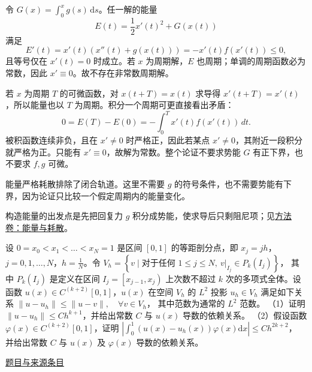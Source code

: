 \documentclass[12pt,fontset=fandol]{ctexart}
\begin{document}
\begin{solve}\label{ans:fin15-low:10}

令 $G(x)=\int_0^xg(s)\,\mathrm ds$。任一解的能量
\[
E(t)=\frac12x'(t)^2+G(x(t))
\]
满足
\[
E'(t)=x'(t)(x''(t)+g(x(t)))=-x'(t)f(x'(t))\le0,
\]
且等号仅在 $x'(t)=0$ 时成立。若 $x$ 为周期解，$E$ 也周期；单调的周期函数必为常数，因此 $x'\equiv0$。故不存在非常数周期解。

若 $x$ 为周期 $T$ 的可微函数，对 $x(t+T)=x(t)$ 求导得 $x'(t+T)=x'(t)$，所以能量也以 $T$ 为周期。积分一个周期可更直接看出矛盾：
\[
0=E(T)-E(0)=-\int_0^T x'(t)f(x'(t))\,dt.
\]
被积函数连续非负，且在 $x'\ne0$ 时严格正，因此若某点 $x'\ne0$，其附近一段积分就严格为正。只能有 $x'\equiv0$，故解为常数。整个论证不要求势能 $G$ 有正下界，也不要求 $f,g$ 可微。

\end{solve}

\begin{remark}[方法与条件]能量严格耗散排除了闭合轨道。这里不需要 $g$ 的符号条件，也不需要势能有下界，因为论证只比较一个假定周期内的能量变化。

构造能量的出发点是先把回复力 $g$ 积分成势能，使求导后只剩阻尼项；见\hyperref[app:dynamics-energy]{方法卷：能量与耗散}。\end{remark}

\begin{example}\label{ex:fin15-high:13}\label{pr:fin15-high:13}

设 $0 = x_{0} < x_{1} < \dots < x_{N} = 1$ 是区间 $[0,1]$ 的等距剖分点，即 $x_{j} = jh$，$j = 0,1,\dots,N$，$h = \frac{1}{N}$。令
$V_{h} = \left\{v \mid \text{对于任何 } 1 \leq j \leq N,\ v|_{I_{j}} \in P_{k}\left(I_{j}\right)\right\}$，
其中 $P_{k}\left(I_{j}\right)$ 是定义在区间 $I_{j} = \left[x_{j-1},x_{j}\right)$ 上次数不超过 $k$ 次的多项式全体。设函数 $u(x) \in C^{(k+2)}[0,1]$，$u(x)$ 在空间 $V_{h}$ 的 $L^{2}$ 投影 $u_{h} \in V_{h}$ 满足如下关系
$\|u - u_{h}\| \leq \|u - v\|, \quad \forall v \in V_{h}$，
其中范数为通常的 $L^{2}$ 范数。
（1）证明 $\|u - u_{h}\| \leq Ch^{k+1}$，并给出常数 $C$ 与 $u(x)$ 导数的依赖关系。
（2）假设函数 $\varphi(x) \in C^{(k+2)}[0,1]$，证明
$\left|\int_{0}^{1}\left(u(x) - u_{h}(x)\right)\varphi(x)\mathrm{d}x\right| \leq Ch^{2k+2}$，
并给出常数 $C$ 与 $u(x)$ 及 $\varphi(x)$ 导数的依赖关系。

\par\href{https://github.com/lzxcr/cmc-mathematics/blob/64916fa1fdbc3e444a652eca204d5669058ee321/src/problems/finals/15/16.md}{题目与来源条目}

\end{example}
\end{document}
